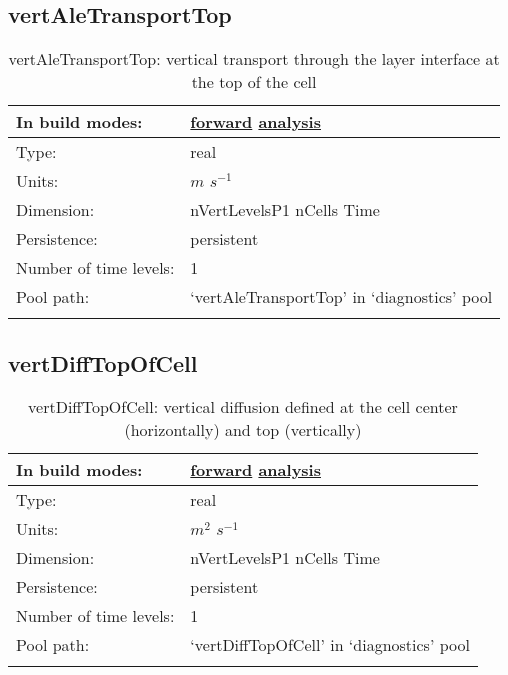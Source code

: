 \subsection[vertAleTransportTop]{vertAleTransportTop}
\label{subsec:var_sec_diagnostics_vertAleTransportTop}
\begin{center}
\begin{longtable}{| p{2.0in} | p{4.0in} |}
        \hline 
        In build modes: & \hyperref[subsec:forward_var_tab_diagnostics]{forward} \hyperref[subsec:analysis_var_tab_diagnostics]{analysis} \\
        \hline 
        Type: & real \\
        \hline 
        Units: & $m$ $s^{-1}$ \\
        \hline 
        Dimension: & nVertLevelsP1 nCells Time \\
        \hline 
        Persistence: & persistent \\
        \hline 
        Number of time levels: & 1 \\
        \hline 
            Pool path: & `vertAleTransportTop' in `diagnostics' pool \\
		 \hline 
    \caption{vertAleTransportTop: vertical transport through the layer interface at the top of the cell}
\end{longtable}
\end{center}
\subsection[vertDiffTopOfCell]{vertDiffTopOfCell}
\label{subsec:var_sec_diagnostics_vertDiffTopOfCell}
\begin{center}
\begin{longtable}{| p{2.0in} | p{4.0in} |}
        \hline 
        In build modes: & \hyperref[subsec:forward_var_tab_diagnostics]{forward} \hyperref[subsec:analysis_var_tab_diagnostics]{analysis} \\
        \hline 
        Type: & real \\
        \hline 
        Units: & $m^2$ $s^{-1}$ \\
        \hline 
        Dimension: & nVertLevelsP1 nCells Time \\
        \hline 
        Persistence: & persistent \\
        \hline 
        Number of time levels: & 1 \\
        \hline 
            Pool path: & `vertDiffTopOfCell' in `diagnostics' pool \\
		 \hline 
    \caption{vertDiffTopOfCell: vertical diffusion defined at the cell center (horizontally) and top (vertically)}
\end{longtable}
\end{center}
